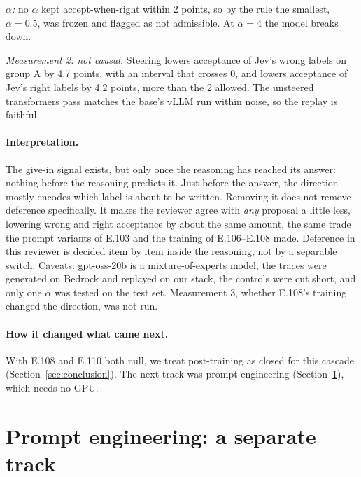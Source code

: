 \documentclass[11pt]{article}
\renewcommand{\_}{\origunderscore\allowbreak}
\begin{document}
\emph{$\alpha$:} no $\alpha$ kept accept-when-right within 2 points, so by the rule the smallest, $\alpha = 0.5$, was frozen and flagged as not admissible. At $\alpha = 4$ the model breaks down.

\emph{Measurement 2: not causal.} Steering lowers acceptance of Jev's wrong labels on group A by 4.7 points, with an interval that crosses 0, and lowers acceptance of Jev's right labels by 4.2 points, more than the 2 allowed. The unsteered transformers pass matches the base's vLLM run within noise, so the replay is faithful.

\paragraph{Interpretation.}
The give-in signal exists, but only once the reasoning has reached its answer: nothing before the reasoning predicts it. Just before the answer, the direction mostly encodes which label is about to be written. Removing it does not remove deference specifically. It makes the reviewer agree with \emph{any} proposal a little less, lowering wrong and right acceptance by about the same amount, the same trade the prompt variants of E.103 and the training of E.106--E.108 made. Deference in this reviewer is decided item by item inside the reasoning, not by a separable switch. Caveats: gpt-oss-20b is a mixture-of-experts model, the traces were generated on Bedrock and replayed on our stack, the controls were cut short, and only one $\alpha$ was tested on the test set. Measurement 3, whether E.108's training changed the direction, was not run.

\paragraph{How it changed what came next.}
With E.108 and E.110 both null, we treat post-training as closed for this cascade (Section~\ref{sec:conclusion}). The next track was prompt engineering (Section~\ref{sec:prompteng}), which needs no GPU.

\section{Prompt engineering: a separate track}\label{sec:prompteng}
\end{document}
